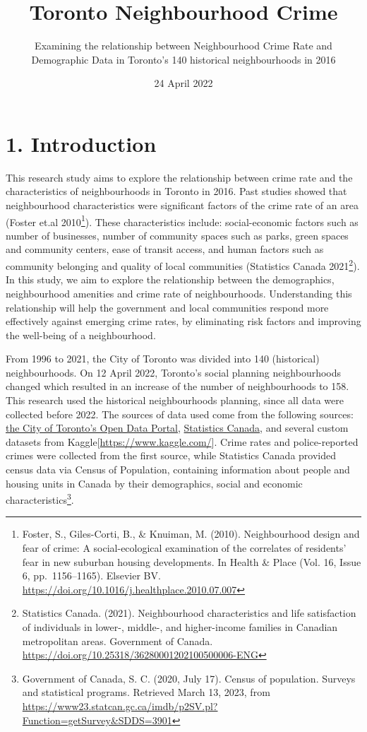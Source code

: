 \documentclass[
]{article}
\title{Toronto Neighbourhood Crime}
\subtitle{Examining the relationship between Neighbourhood Crime Rate
and Demographic Data in Toronto's 140 historical neighbourhoods in 2016}
\author{}
\date{\vspace{-2.5em}24 April 2022}
\begin{document}
\maketitle

{
\setcounter{tocdepth}{2}
\tableofcontents
}
\hypertarget{introduction}{%
\section{1. Introduction}\label{introduction}}

This research study aims to explore the relationship between crime rate
and the characteristics of neighbourhoods in Toronto in 2016. Past
studies showed that neighbourhood characteristics were significant
factors of the crime rate of an area (Foster et.al 2010\footnote{Foster,
  S., Giles-Corti, B., \& Knuiman, M. (2010). Neighbourhood design and
  fear of crime: A social-ecological examination of the correlates of
  residents' fear in new suburban housing developments. In Health \&
  Place (Vol. 16, Issue 6, pp.~1156--1165). Elsevier BV.
  \url{https://doi.org/10.1016/j.healthplace.2010.07.007}}). These
characteristics include: social-economic factors such as number of
businesses, number of community spaces such as parks, green spaces and
community centers, ease of transit access, and human factors such as
community belonging and quality of local communities (Statistics Canada
2021\footnote{Statistics Canada. (2021). Neighbourhood characteristics
  and life satisfaction of individuals in lower-, middle-, and
  higher-income families in Canadian metropolitan areas. Government of
  Canada. \url{https://doi.org/10.25318/36280001202100500006-ENG}}). In
this study, we aim to explore the relationship between the demographics,
neighbourhood amenities and crime rate of neighbourhoods. Understanding
this relationship will help the government and local communities respond
more effectively against emerging crime rates, by eliminating risk
factors and improving the well-being of a neighbourhood.

From 1996 to 2021, the City of Toronto was divided into 140 (historical)
neighbourhoods. On 12 April 2022, Toronto's social planning
neighbourhoods changed which resulted in an increase of the number of
neighbourhoods to 158. This research used the historical neighbourhoods
planning, since all data were collected before 2022. The sources of data
used come from the following sources:
\href{https://www.toronto.ca/city-government/data-research-maps/open-data/}{the
City of Toronto's Open Data Portal},
\href{https://www.statcan.gc.ca/en/start}{Statistics Canada}, and
several custom datasets from Kaggle{[}\url{https://www.kaggle.com/}{]}.
Crime rates and police-reported crimes were collected from the first
source, while Statistics Canada provided census data via Census of
Population, containing information about people and housing units in
Canada by their demographics, social and economic
characteristics\footnote{Government of Canada, S. C. (2020, July 17).
  Census of population. Surveys and statistical programs. Retrieved
  March 13, 2023, from
  \url{https://www23.statcan.gc.ca/imdb/p2SV.pl?Function=getSurvey\&SDDS=3901}}.
\end{document}
